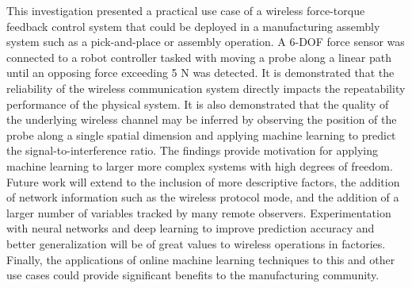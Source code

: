 This investigation presented a practical use case of a wireless force-torque feedback control system that could be deployed in a manufacturing assembly system such as a pick-and-place or assembly operation.  A 6-DOF force sensor was connected to a robot controller tasked with moving a probe along a linear path until an opposing force exceeding 5 N was detected.  It is demonstrated that the reliability of the wireless communication system directly impacts the repeatability performance of the physical system. It is also demonstrated that the quality of the underlying wireless channel may be inferred by observing the position of the probe along a single spatial dimension and applying machine learning to predict the signal-to-interference ratio. The findings provide motivation for applying machine learning to larger more complex systems with high degrees of freedom. Future work will extend to the inclusion of more descriptive factors, the addition of network information such as the wireless protocol mode, and the addition of a larger number of variables tracked by many remote observers. Experimentation with neural networks and deep learning to improve prediction accuracy and better generalization will be of great values to wireless operations in factories.  Finally, the applications of online machine learning techniques to this and other use cases could provide significant benefits to the manufacturing community.



